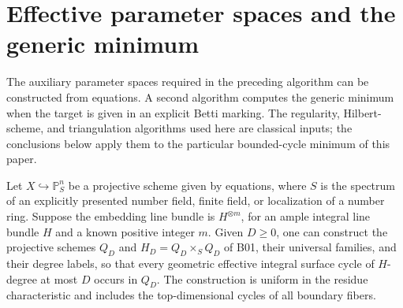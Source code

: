 \section{Effective parameter spaces and the generic minimum}
\label{sec:effective-generic}

The auxiliary parameter spaces required in the preceding algorithm can
be constructed from equations. A second algorithm computes the generic
minimum when the target is given in an explicit Betti marking. The
regularity, Hilbert-scheme, and triangulation algorithms used here are
classical inputs; the conclusions below apply them to the particular
bounded-cycle minimum of this paper.

\begin{proposition}
\label{prop:R42}
Let $X\hookrightarrow\mathbb P^n_S$ be a projective scheme given by
equations, where $S$ is the spectrum of an explicitly presented number
field, finite field, or localization of a number ring. Suppose the
embedding line bundle is $H^{\otimes m}$, for an ample integral line
bundle $H$ and a known positive integer $m$. Given $D\geq0$, one can
construct the projective schemes $Q_D$ and $H_D=Q_D\times_S Q_D$ of
B01, their universal families, and their degree labels, so that every
geometric effective integral surface cycle of $H$-degree at most $D$
occurs in $Q_D$. The construction is uniform in the residue
characteristic and includes the top-dimensional cycles of all boundary
fibers.
\end{proposition}

